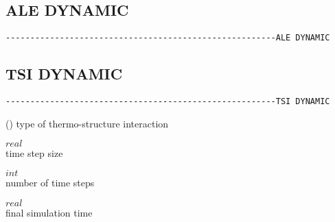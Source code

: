 





\subsection{ALE DYNAMIC}
\begin{verbatim}
-------------------------------------------------------ALE DYNAMIC
\end{verbatim}


\subsection{TSI DYNAMIC}
\begin{verbatim}
-------------------------------------------------------TSI DYNAMIC
\end{verbatim}

 (\kor{}\kor{})
type of thermo-structure interaction

 $real$\\
time step size

 $int$\\
number of time steps

 $real$\\
final simulation time

